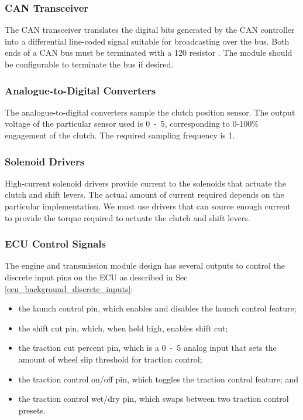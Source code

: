 \subsubsection{CAN Transceiver}

The CAN transceiver translates the digital bits generated by the CAN controller into a differential line-coded signal suitable for broadcasting over the bus. Both ends of a CAN bus must be terminated with a \unit{120}{\ohm} resistor \cite{MCP2551}. The module should be configurable to terminate the bus if desired.

\subsubsection{Analogue-to-Digital Converters}

The analogue-to-digital converters sample the clutch position sensor. The output voltage of the particular sensor used is \unit{0-5}{\volt}, corresponding to 0-100\% engagement of the clutch. The required sampling frequency is \unit{1}{\kilo\hertz}.

\subsubsection{Solenoid Drivers}

High-current solenoid drivers provide current to the solenoids that actuate the clutch and shift levers. The actual amount of current required depends on the particular implementation. We must use drivers that can source enough current to provide the torque required to actuate the clutch and shift levers. 
 
\subsubsection{ECU Control Signals}

The engine and transmission module design has several outputs to control the discrete input pins on the ECU as described in Sec \ref{ecu_background_discrete_inputs}:

\begin{itemize}
  \item the launch control pin, which enables and disables the launch control feature;
  \item the shift cut pin, which, when held high, enables shift cut;
  \item the traction cut percent pin, which is a \unit{0-5}{\volt} analog input that sets the amount of wheel slip threshold for traction control;
  \item the traction control on/off pin, which toggles the traction control feature; and
  \item the traction control wet/dry pin, which swaps between two traction control presets.
\end{itemize}

